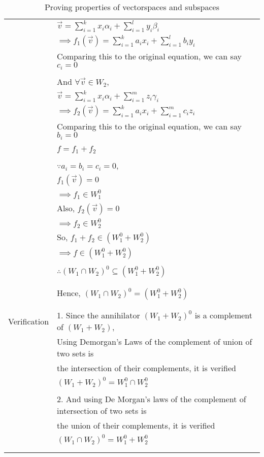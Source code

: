\begin{longtable}{|l|l|}
        & $\vec{v} = \sum_{i=1}^{k} x_i\alpha_i + \sum_{i=1}^{l} y_i\beta_i$\\
        & $\implies f_1(\vec{v}) = \sum_{i=1}^{k} a_ix_i + \sum_{i=1}^{l} b_iy_i$\\
        & Comparing this to the original equation, we can say $c_i = 0$\\
        & \\
        & And $\forall \vec{v} \in W_2$,\\
        & $\vec{v} = \sum_{i=1}^{k} x_i\alpha_i + \sum_{i=1}^{m} z_i\gamma_i$\\
        & $\implies f_2(\vec{v}) = \sum_{i=1}^{k} a_ix_i + \sum_{i=1}^{m} c_iz_i$\\
        & Comparing this to the original equation, we can say $b_i = 0$\\
        & \\
        & $f = f_1 + f_2$\\
        & \\
        & $\because a_i = b_i = c_i = 0$,\\
        & $f_1(\vec{v}) = 0$\\
        & $\implies f_1 \in W_1^0$\\
        & Also, $f_2(\vec{v}) = 0$\\
        & $\implies f_2 \in W_2^0$\\
        & So, $f_1 + f_2 \in (W_1^0 + W_2^0)$\\
        & $\implies f \in (W_1^0 + W_2^0)$\\
        & \\
        & $\therefore (W_1 \cap W_2)^0 \subseteq (W_1^0 + W_2^0)$\\
        & \\
    \hline
        & \\
        & Hence, $(W_1 \cap W_2)^0 = (W_1^0 + W_2^0)$\\
        & \\
    \hline
        & \\
        Verification & 1. Since the annihilator $(W_1 + W_2)^0$ is a complement of $(W_1 + W_2)$,\\
        & Using Demorgan's Laws of the complement of union of two sets is\\
        & the intersection of their complements, it is verified\\
        & $(W_1 + W_2)^0 = W_1^0 \cap W_2^0$\\
        &\\
        & 2. And using De Morgan's laws of the complement of intersection of two sets is\\
        & the union of their complements, it is verified\\
        & $(W_1 \cap W_2)^0 = W_1^0 + W_2^0$\\
        & \\
    \hline
    \caption{Proving properties of vectorspaces and subspaces}
    \label{eq:solutions/3/5/11/tab:proof}
\end{longtable}
\twocolumn
